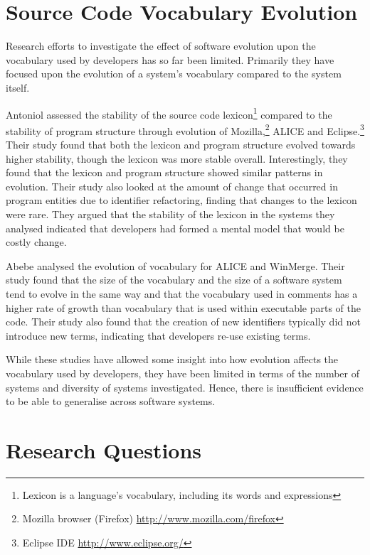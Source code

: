 
\section{Source Code Vocabulary Evolution} %
\label{sec:source_code_vocabulary_evolution}

Research efforts to investigate the effect of software evolution upon the vocabulary used by developers has so far been limited. Primarily they have focused upon the evolution of a system's vocabulary compared to the system itself.

Antoniol \etal \cite{Antoniol07a} assessed the stability of the source code lexicon\footnote{Lexicon is a language's vocabulary, including its words and expressions} compared to the stability of program structure through evolution of Mozilla,\footnote{Mozilla browser (Firefox) \url{http://www.mozilla.com/firefox}} ALICE and Eclipse.\footnote{Eclipse IDE \url{http://www.eclipse.org/}} Their study found that both the lexicon and program structure evolved towards higher stability, though the lexicon was more stable overall. Interestingly, they found that the lexicon and program structure showed similar patterns in evolution. Their study also looked at the amount of change that occurred in program entities due to identifier refactoring, finding that changes to the lexicon were rare. They argued that the stability of the lexicon in the systems they analysed indicated that developers had formed a mental model that would be costly change.

Abebe \etal \cite{Abebe09a} analysed the evolution of vocabulary for ALICE and WinMerge. Their study found that the size of the vocabulary and the size of a software system tend to evolve in the same way and that the vocabulary used in comments has a higher rate of growth than vocabulary that is used within executable parts of the code. Their study also found that the creation of new identifiers typically did not introduce new terms, indicating that developers re-use existing terms.

While these studies have allowed some insight into how evolution affects the vocabulary used by developers, they have been limited in terms of the number of systems and diversity of systems investigated. Hence, there is insufficient evidence to be able to generalise across software systems.


\section{Research Questions} %
\label{sec:research_questions}

